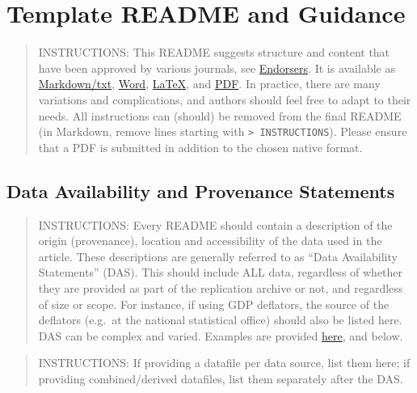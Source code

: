 \documentclass[
]{article}
\author{}
\date{}
\begin{document}
\hypertarget{template-readme-and-guidance}{%
\section{Template README and
Guidance}\label{template-readme-and-guidance}}

\begin{quote}
INSTRUCTIONS: This README suggests structure and content that have been
approved by various journals, see \href{Endorsers.md}{Endorsers}. It is
available as
\href{https://github.com/social-science-data-editors/template_README/blob/master/template-README.md}{Markdown/txt},
\href{templates/README.docx}{Word}, \href{templates/README.tex}{LaTeX},
and \href{templates/README.pdf}{PDF}. In practice, there are many
variations and complications, and authors should feel free to adapt to
their needs. All instructions can (should) be removed from the final
README (in Markdown, remove lines starting with
\texttt{\textgreater{}\ INSTRUCTIONS}). Please ensure that a PDF is
submitted in addition to the chosen native format.
\end{quote}

\hypertarget{data-availability-and-provenance-statements}{%
\subsection{Data Availability and Provenance
Statements}\label{data-availability-and-provenance-statements}}

\begin{quote}
INSTRUCTIONS: Every README should contain a description of the origin
(provenance), location and accessibility of the data used in the
article. These descriptions are generally referred to as ``Data
Availability Statements'' (DAS). This should include ALL data,
regardless of whether they are provided as part of the replication
archive or not, and regardless of size or scope. For instance, if using
GDP deflators, the source of the deflators (e.g.~at the national
statistical office) should also be listed here. DAS can be complex and
varied. Examples are provided
\href{Requested_information_dcas.md}{here}, and below.
\end{quote}

\begin{quote}
INSTRUCTIONS: If providing a datafile per data source, list them here;
if providing combined/derived datafiles, list them separately after the
DAS.
\end{quote}
\end{document}
